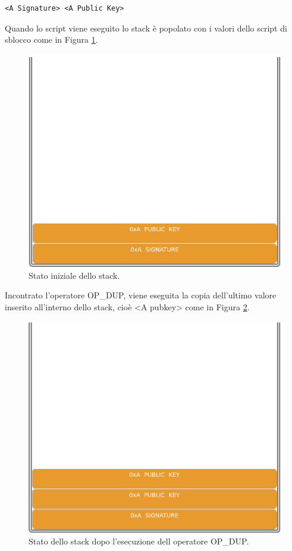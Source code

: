 \begin{lstlisting}[language=bitcoinscript, caption={P2PKH Script di sblocco}]
<A Signature> <A Public Key>
\end{lstlisting}



Quando lo script viene eseguito lo stack è popolato con i valori dello script di sblocco come in Figura \ref{fig:stackp2pkh01}.
\begin{figure}[h]
\begin{center}
\includegraphics[width=0.6\columnwidth]{images/script/p2pkh/1.png}
\end{center}
\caption{Stato iniziale dello stack.}
\label{fig:stackp2pkh01}
\end{figure}

Incontrato l’operatore OP\_DUP, viene eseguita la copia dell’ultimo valore inserito all’interno dello stack, cioè <A pubkey> come in Figura \ref{fig:stackp2pkh02}.
\begin{figure}[h]
\begin{center}
\includegraphics[width=0.6\columnwidth]{images/script/p2pkh/2.png}
\end{center}
\caption{Stato dello stack dopo l’esecuzione dell operatore OP\_DUP.}
\label{fig:stackp2pkh02}
\end{figure}

